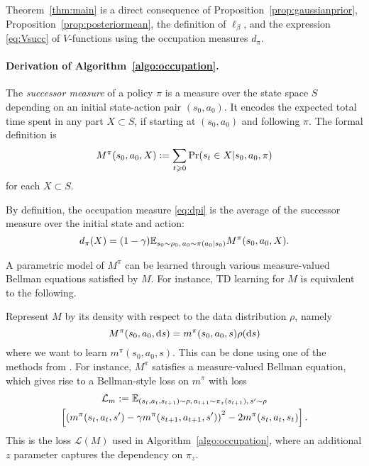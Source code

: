 \documentclass[11pt,a4paper]{article}
\newcommand{\loss}{\mathcal{L}}
\begin{document}
\begin{dem}
Theorem~\ref{thm:main} is a direct consequence of
Proposition~\ref{prop:gaussianprior},
Proposition~\ref{prop:posteriormean}, the definition of $\ell_\beta$, and
the expression \eqref{eq:Vsucc} of
$V$-functions using the occupation measures $d_\pi$.
\end{dem}



\paragraph{Derivation of Algorithm~\ref{algo:occupation}.}
The \emph{successor measure} \cite{successorstates} of a policy $\pi$ is
a measure over the state space $S$ depending on an initial state-action
pair $(s_0,a_0)$. It encodes the expected total time spent in any part
$X\subset S$, if starting at $(s_0,a_0)$ and following $\pi$. The formal
definition is
\begin{equation}
M^{\pi}(s_0,a_0,X)\deq \sum_{t\geq 0} \Pr(s_t\in X|s_0,a_0,\pi)
\end{equation}
for each $X\subset S$.

By definition, the occupation measure \eqref{eq:dpi} is the average of
the successor measure over the initial state and action:
\begin{equation}
\label{eq:dm}
d_\pi(X)=(1-\gamma) \mathbb{E}_{s_0\sim \rho_0, \, a_0\sim \pi(a_0|s_0)}
M^\pi(s_0,a_0,X).
\end{equation}

A parametric model of $M^\pi$ can be learned through various measure-valued Bellman
equations satisfied by $M$. For instance, TD learning for $M$ is
equivalent to the following.

Represent $M$ by its density with respect to the data distribution
$\rho$, namely
\begin{equation}
M^{\pi}(s_0,a_0,\operatorname{d}\!{} s)=m^\pi(s_0,a_0,s)\rho(\operatorname{d}\!{} s)
\end{equation}
where we want to learn $m^\pi(s_0,a_0,s)$.
This can be done using one of the methods from
\cite{successorstates}. For instance, $M^\pi$ satisfies a measure-valued
Bellman equation, which gives rise to a Bellman-style loss on $m^\pi$
with loss
\begin{multline}
\label{eq:lossm}
\loss_m\deq \E_{
(s_t,a_t,s_{t+1})\sim \rho,\,
a_{t+1}\sim \pi_z(s_{t+1}),\,
s'\sim \rho
}\\
\left[
\left(m^\pi(s_t,a_t,s')-\gamma
m^\pi(s_{t+1},a_{t+1},s')\right)^2-2m^\pi(s_t,a_t,s_t)
\right].
\end{multline}
This is the loss $\loss(M)$ used in
Algorithm~\ref{algo:occupation}, where an additional $z$ parameter
captures the dependency on $\pi_z$.
\end{document}
